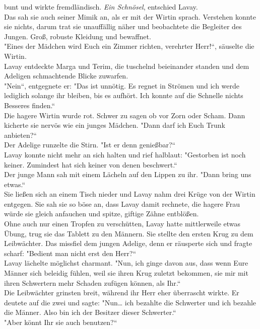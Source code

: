 bunt und wirkte fremdländisch. \textit{Ein Schnösel}, entschied Lavay.\\Das sah sie auch seiner 
Mimik an, als er mit der Wirtin sprach. Verstehen konnte sie nichts, darum trat sie unauffällig 
näher und beobachtete die Begleiter des Jungen. Groß, robuste Kleidung und bewaffnet.\\
"Eines der Mädchen wird Euch ein Zimmer richten, verehrter Herr!``, säuselte die Wirtin.\\
Lavay entdeckte Marga und Terim, die tuschelnd beieinander standen und dem Adeligen schmachtende 
Blicke zuwarfen. \\
"Nein``, entgegnete er: "Das ist unnötig. Es regnet in Strömen und ich werde lediglich 
solange ihr bleiben, bis es aufhört. Ich konnte auf die Schnelle nichts Besseres finden.``\\
Die hagere Wirtin wurde rot. Schwer zu sagen ob vor Zorn oder Scham. Dann kicherte sie nervös wie 
ein junges Mädchen. "Dann darf ich Euch Trunk anbieten?``\\
Der Adelige runzelte die Stirn. "Ist er denn genießbar?``\\
Lavay konnte nicht mehr an sich halten und rief halblaut: "Gestorben ist noch keiner. Zumindest hat 
sich keiner von denen beschwert.``\\
Der junge Mann sah mit einem Lächeln auf den Lippen zu ihr. "Dann bring uns etwas.``\\
Sie ließen sich an einem Tisch nieder und Lavay nahm drei Krüge von der Wirtin entgegen. Sie sah 
sie so böse an, dass Lavay damit rechnete, die hagere Frau würde sie gleich anfauchen und spitze, 
giftige Zähne entblößen.\\
Ohne auch nur einen Tropfen zu verschütten, Lavay hatte mittlerweile etwas Übung, trug sie das 
Tablett zu den Männern. Sie stellte den ersten Krug zu dem Leibwächter. Das missfiel dem jungen 
Adelige, denn er räusperte sich und fragte scharf: "Bedient man nicht erst den Herr?``\\
Lavay lächelte möglichst charmant. "Nun, ich ginge davon aus, dass wenn Eure Männer sich beleidig 
fühlen, weil sie ihren Krug zuletzt bekommen, sie mir mit ihren Schwertern mehr Schaden zufügen 
können, als Ihr.``\\
Die Leibwächter grinsten breit, während ihr Herr eher überrascht wirkte. Er deutete auf die zwei 
und sagte: "Nun… ich bezahlte die Schwerter und ich bezahle die Männer. Also bin ich der Besitzer 
dieser Schwerter.``\\
"Aber könnt Ihr sie auch benutzen?``\\
